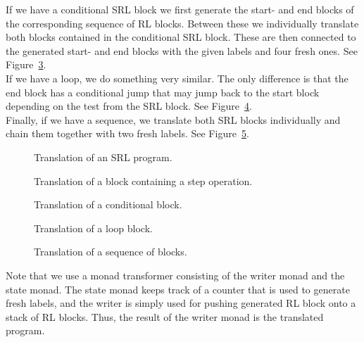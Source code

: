 \noindent If we have a conditional SRL block we first generate the start- and end blocks of the corresponding sequence of RL blocks. Between these we individually translate both blocks contained in the conditional SRL block. These are then connected to the generated start- and end blocks with the given labels and four fresh ones. See Figure~\ref{fig:trlBlkIf}.\\

\noindent If we have a loop, we do something very similar. The only difference is that the end block has a conditional jump that may jump back to the start block depending on the test from the SRL block. See Figure~\ref{fig:trlBlkLoop}.\\

\noindent Finally, if we have a sequence, we translate both SRL blocks individually and chain them together with two fresh labels. See Figure~\ref{fig:trlBlkSeq}.

\begin{figure}[H]
  
  \caption{Translation of an SRL program.}\label{fig:trlProg}
\end{figure}

\begin{figure}[H]
  
  \caption{Translation of a block containing a step operation.}\label{fig:trlBlkStep}
\end{figure}

\begin{figure}[H]
  
  \caption{Translation of a conditional block.}\label{fig:trlBlkIf}
\end{figure}

\begin{figure}[H]
  
  \caption{Translation of a loop block.}\label{fig:trlBlkLoop}
\end{figure}

\begin{figure}[H]
  
  \caption{Translation of a sequence of blocks.}\label{fig:trlBlkSeq}
\end{figure}

\noindent Note that we use a monad transformer consisting of the writer monad and the state monad. The state monad keeps track of a counter that is used to generate fresh labels, and the writer is simply used for pushing generated RL block onto a stack of RL blocks. Thus, the result of the writer monad is the translated program.

